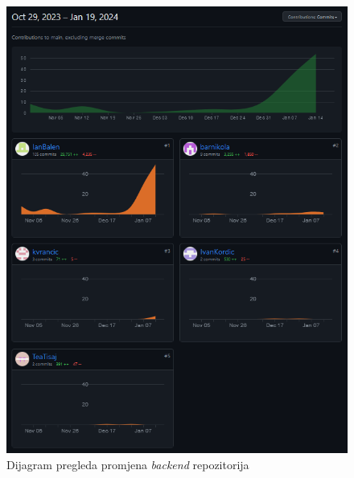 		\begin{figure}[h!]
 		   \centering
 		   \includegraphics[width=\textwidth]{slike/backendGitHub.png} 
 		   \caption{Dijagram pregleda promjena \textit{backend} repozitorija}
 		   \label{fig:my_image}
		\end{figure}


